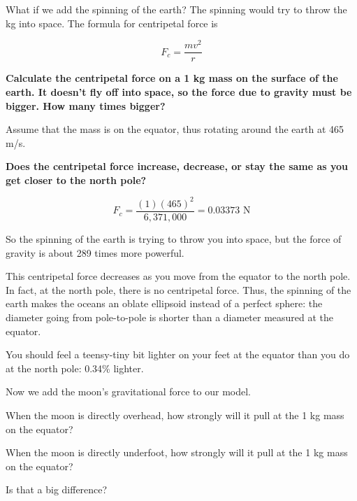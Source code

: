 \begin{Exercise}[title={Life Among the Orbits 2: Earth Centripetal Force}, label=life-orbits2]

What if we add the spinning of the earth?  The spinning would try to throw the kg into space.  The 
formula for centripetal force is

$$F_c = \frac{m v^2}{r} $$

\textbf{Calculate the centripetal force on a 1 kg mass on the surface of the earth.   It doesn't fly off into space,  so the force due to gravity must be bigger.  How many times bigger?}

Assume that the mass is on the equator,  thus rotating around the earth at 465 m/s.

\textbf{Does the centripetal force increase, decrease, or stay the same as you get closer to the north pole?}

\end{Exercise}

\begin{Answer}[ref=life-orbits2]

$$F_c = \frac{(1) (465)^2}{6,371,000}  = 0.03373 \text{ N}$$

So the spinning of the earth is trying to throw you into space,  but the force of gravity is about 289 times more powerful.

This centripetal force decreases as you move from the equator to the north pole.   In fact, at the north pole, 
there is no centripetal force.   Thus, the spinning of the earth makes the oceans an oblate ellipsoid instead of a perfect sphere: the diameter going from pole-to-pole is shorter than a diameter measured at the equator.

You should feel a teensy-tiny bit lighter on your feet at the equator than you do at the north pole: 0.34\% lighter.

\end{Answer}

\begin{Exercise}[title={Life Among the Orbits 3: The Moon's Gravity}, label=life-orbits3]

Now we add the moon's gravitational force to our model.

When the moon is directly overhead,   how strongly will it pull at the 1 kg mass on the equator?

When the moon is directly underfoot,  how strongly will it pull at the 1 kg mass on the equator?

Is that a big difference?

\end{Exercise}

